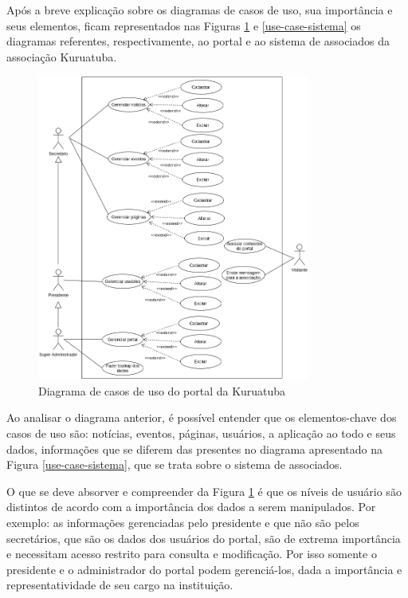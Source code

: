 Após a breve explicação sobre os diagramas de casos de uso, sua importância e seus elementos, ficam representados nas Figuras \ref{use-case-portal} e \ref{use-case-sistema} os diagramas referentes, respectivamente, ao portal e ao sistema de associados da associação Kuruatuba.

\newpage

\begin{figure}[htb]
 \centering
 \caption{Diagrama de casos de uso do portal da Kuruatuba}
 \includegraphics[width=0.8\textwidth]{figuras/use-case-portal.png}
 
 \label{use-case-portal}
\end{figure}

Ao analisar o diagrama anterior, é possível entender que os elementos-chave dos casos de uso são: notícias, eventos, páginas, usuários, a aplicação ao todo e seus dados, informações que se diferem das presentes no diagrama apresentado na Figura \ref{use-case-sistema}, que se trata sobre o sistema de associados. 

O que se deve absorver e compreender da Figura \ref{use-case-portal} é que os níveis de usuário são distintos de acordo com a importância dos dados a serem manipulados. Por exemplo: as informações gerenciadas pelo presidente e que não são pelos secretários, que são os dados dos usuários do portal, são de extrema importância e necessitam acesso restrito para consulta e modificação. Por isso somente o presidente e o administrador do portal podem gerenciá-los, dada a importância e representatividade de seu cargo na instituição. 

